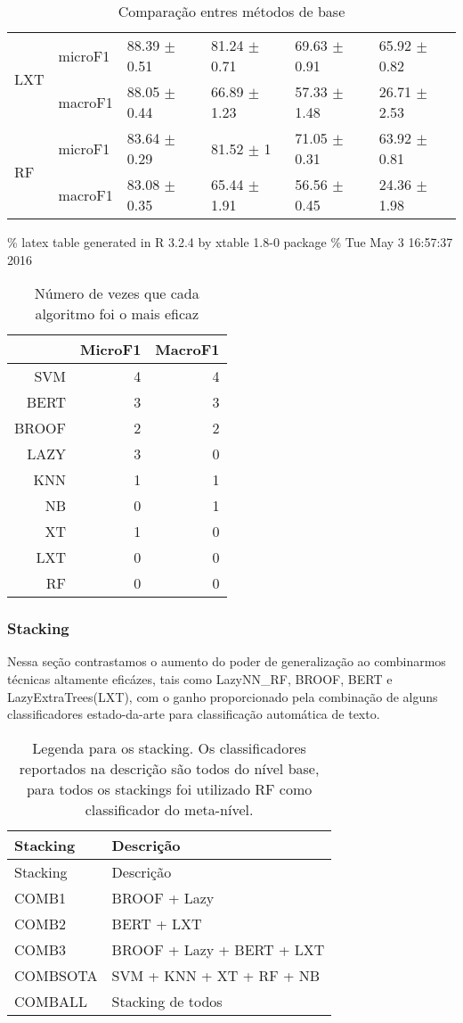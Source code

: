 \documentclass[]{article}
\begin{document}
\begin{table}[ht]
\begin{tabular}{llllll}
   \cline{3-6}\multirow{2}{*}{LXT} & microF1 & 88.39 $\pm$  0.51 & 81.24 $\pm$  0.71 & 69.63 $\pm$  0.91 & 65.92 $\pm$  0.82 \\ 
   & macroF1 & 88.05 $\pm$  0.44 & 66.89 $\pm$  1.23 & 57.33 $\pm$  1.48 & 26.71 $\pm$  2.53 \\ 
   \cline{3-6}\multirow{2}{*}{RF} & microF1 & 83.64 $\pm$  0.29 & 81.52 $\pm$  1 & 71.05 $\pm$  0.31 & 63.92 $\pm$  0.81 \\ 
   & macroF1 & 83.08 $\pm$  0.35 & 65.44 $\pm$  1.91 & 56.56 $\pm$  0.45 & 24.36 $\pm$  1.98 \\ 
   \cline{3-6}\end{tabular}
\caption{Comparação entres métodos de base} 
\label{tab:base}
\end{table}

\% latex table generated in R 3.2.4 by xtable 1.8-0 package \% Tue May 3
16:57:37 2016

\begin{table}[ht]
\centering
\begin{tabular}{rrr}
  \hline
 & MicroF1 & MacroF1 \\ 
  \hline
SVM &   4 &   4 \\ 
  BERT &   3 &   3 \\ 
  BROOF &   2 &   2 \\ 
  LAZY &   3 &   0 \\ 
  KNN &   1 &   1 \\ 
  NB &   0 &   1 \\ 
  XT &   1 &   0 \\ 
  LXT &   0 &   0 \\ 
  RF &   0 &   0 \\ 
   \hline
\end{tabular}
\caption{Número de vezes que cada algoritmo foi o mais eficaz} 
\label{tab:win_count:base}
\end{table}

\subsubsection{Stacking}\label{stacking-1}

Nessa seção contrastamos o aumento do poder de generalização ao
combinarmos técnicas altamente eficázes, tais como LazyNN\_RF, BROOF,
BERT e LazyExtraTrees(LXT), com o ganho proporcionado pela combinação de
alguns classificadores estado-da-arte para classificação automática de
texto.

\begin{longtable}[c]{@{}ll@{}}
\caption{Legenda para os stacking. Os classificadores reportados na
descrição são todos do nível base, para todos os stackings foi utilizado
RF como classificador do meta-nível.}\tabularnewline
\toprule
Stacking & Descrição\tabularnewline
\midrule
\endfirsthead
\toprule
Stacking & Descrição\tabularnewline
\midrule
\endhead
COMB1 & BROOF + Lazy\tabularnewline
COMB2 & BERT + LXT\tabularnewline
COMB3 & BROOF + Lazy + BERT + LXT\tabularnewline
COMBSOTA & SVM + KNN + XT + RF + NB\tabularnewline
COMBALL & Stacking de todos\tabularnewline
\bottomrule
\end{longtable}
\end{document}
